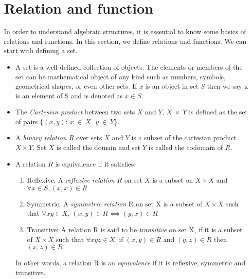 \section{Relation and function}
In order to understand algebraic structures, it is essential to know some basics
of relations and functions. In this section, we define relations and functions.
We can start with defining a set.
\begin{itemize}
\item A set is a well-defined collection of objects. The elements or members of the
set can be mathematical object of any kind such as numbers, symbols, geometrical
shapes, or even other sets. If $x$ is an object in set $S$ then we say x is an
element of S and is denoted as $x \in S$.

\item The \emph{Cartesian product} between two sets $X$ and $Y$,  $X \ \times\
Y$ is defined as the set of pairs \(\{(x,y) :\ x \ \in\ X,\ y\ \in\ Y \}\). 

\item A \emph{binary relation}  $R$ over sets $X$ and $Y$ is a subset of the
cartesian product $X \times Y$. Set $X$ is called the domain and set $Y$ is
called the codomain of $R$.

\item A relation $R$ is equivalence if it satisfies:
\begin{enumerate}
    \item Reflexive: A \emph{reflexive relation} $R$ on set $X$ is a subset on
\(X \times X\) and $\forall x \in S, (x,x) \in R$

    \item Symmetric: A \emph{symmetric relation} R on set X is a subset of \(X
\times X\) such that \(\forall x y \in X,\ (x,y) \in R ⟺ (y,x) \in R \)

    \item Transitive: A relation R is said to be \emph{transitive} on set X, if
it is a subset of \(X \times X\) such that \(∀ x y z \in X \), if \((x,y) \in
R\) and \((y,z) \in R \) then \((x,z) \in R\)
\end{enumerate}
In other words, a relation R is an \emph{equivalence} if it is reflexive, symmetric and transitive.


\end{itemize}
